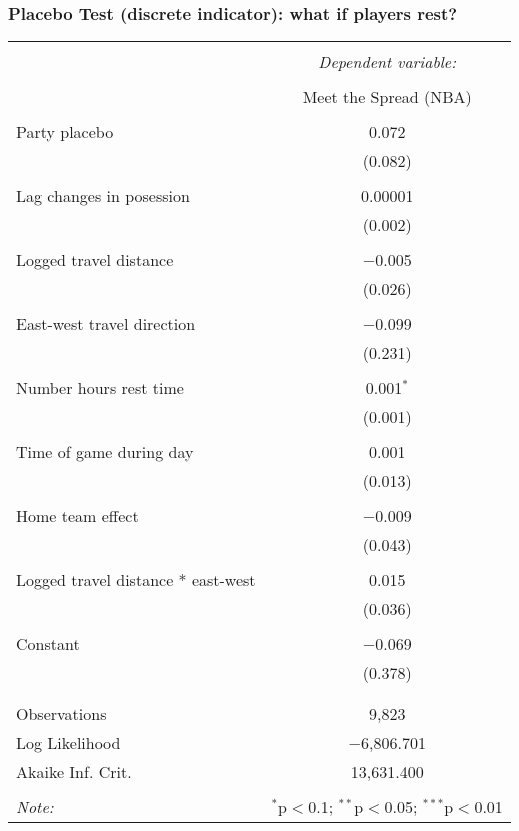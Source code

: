 \documentclass{beamer}
\begin{document}
\begin{frame}   \frametitle{Placebo Test (discrete indicator): what if players rest?}
  \centering
  \tiny{
\begin{tabular}{@{\extracolsep{5pt}}lc}  \\[-1.8ex]\hline  \hline \\[-1.8ex]   & \multicolumn{1}{c}{\textit{Dependent variable:}} \\  \cline{2-2}  \\[-1.8ex] & Meet the Spread (NBA) \\  \hline \\[-1.8ex]   Party placebo & 0.072 \\    & (0.082) \\    & \\   Lag changes in posession & 0.00001 \\    & (0.002) \\    & \\   Logged travel distance & $-$0.005 \\    & (0.026) \\    & \\   East-west travel direction & $-$0.099 \\    & (0.231) \\    & \\   Number hours rest time & 0.001$^{*}$ \\    & (0.001) \\    & \\   Time of game during day & 0.001 \\    & (0.013) \\    & \\   Home team effect & $-$0.009 \\    & (0.043) \\    & \\   Logged travel distance * east-west & 0.015 \\    & (0.036) \\    & \\   Constant & $-$0.069 \\    & (0.378) \\    & \\  \hline \\[-1.8ex]  Observations & 9,823 \\  Log Likelihood & $-$6,806.701 \\  Akaike Inf. Crit. & 13,631.400 \\  \hline  \hline \\[-1.8ex]  \textit{Note:}  & \multicolumn{1}{r}{$^{*}$p$<$0.1; $^{**}$p$<$0.05; $^{***}$p$<$0.01} \\  \end{tabular}  } \end{frame}
\end{document}
